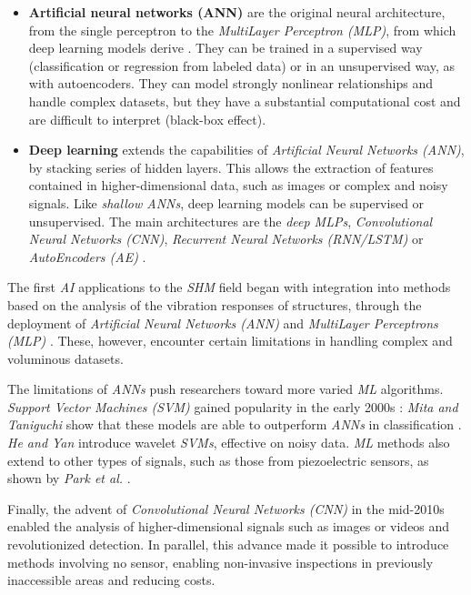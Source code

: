 \documentclass[12pt]{article}
\begin{document}
\begin{itemize}[itemsep=8pt]

    \item \textbf{Artificial neural networks (ANN)} are the original neural architecture, from the single perceptron to the \textit{MultiLayer Perceptron (MLP)}, from which deep learning models derive \cite{s25196136}. They can be trained in a supervised way (classification or regression from labeled data) or in an unsupervised way, as with autoencoders. They can model strongly nonlinear relationships and handle complex datasets, but they have a substantial computational cost and are difficult to interpret (black-box effect).
    
    \item \textbf{Deep learning} extends the capabilities of \textit{Artificial Neural Networks (ANN)}, by stacking series of hidden layers. This allows the extraction of features contained in higher-dimensional data, such as images or complex and noisy signals. Like \textit{shallow ANNs}, deep learning models can be supervised or unsupervised. The main architectures are the \textit{deep MLPs}, \textit{Convolutional Neural Networks (CNN)}, \textit{Recurrent Neural Networks (RNN/LSTM)} or \textit{AutoEncoders (AE)} \cite{s25196136, infrastructures11070228}.
 
\end{itemize}
 
The first \textit{AI} applications to the \textit{SHM} field began with integration into methods based on the analysis of the vibration responses of structures, through the deployment of \textit{Artificial Neural Networks (ANN)} and \textit{MultiLayer Perceptrons (MLP)} \cite{SPENCER2025100203}. These, however, encounter certain limitations in handling complex and voluminous datasets.  
 
The limitations of \textit{ANNs} push researchers toward more varied \textit{ML} algorithms. \textit{Support Vector Machines (SVM)} gained popularity in the early 2000s : \textit{Mita and Taniguchi} show that these models are able to outperform \textit{ANNs} in classification \cite{SPENCER2025100203}. \textit{He and Yan} \cite{he2007structural} introduce wavelet \textit{SVMs}, effective on noisy data. \textit{ML} methods also extend to other types of signals, such as those from piezoelectric sensors, as shown by \textit{Park et al.} \cite{park2007builtin}.
 
Finally, the advent of \textit{Convolutional Neural Networks (CNN)} in the mid-2010s enabled the analysis of higher-dimensional signals such as images or videos and revolutionized detection. In parallel, this advance made it possible to introduce methods involving no sensor, enabling non-invasive inspections in previously inaccessible areas and reducing costs. \cite{SPENCER2025100203}
 
\end{document}
